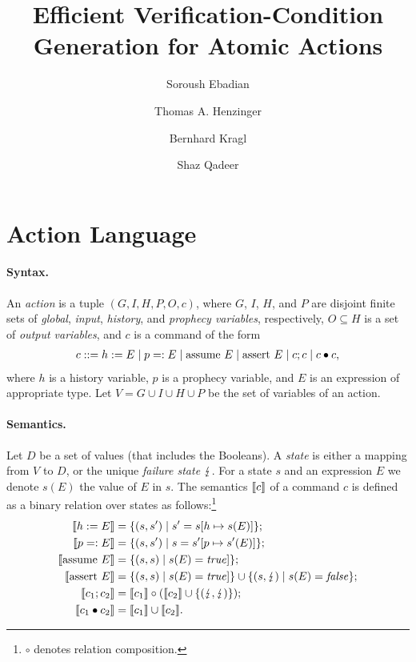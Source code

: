 \documentclass[runningheads,orivec]{llncs}
\begin{document}
\title{Efficient Verification-Condition Generation for Atomic Actions}

\author{%
Soroush Ebadian \and
Thomas A. Henzinger \and
Bernhard Kragl \and
Shaz Qadeer}



\maketitle

\section{Action Language}

\paragraph{Syntax.}
%
An \emph{action} is a tuple $(G,I,H,P,O,c)$, where $G$, $I$, $H$, and $P$ are disjoint finite sets of \emph{global}, \emph{input}, \emph{history}, and \emph{prophecy variables}, respectively, $O \subseteq H$ is a set of \emph{output variables}, and $c$ is a command of the form
%
\begin{align*}
  c ::= h := E \mid p =: E \mid \mathrm{assume}\ E \mid \mathrm{assert}\ E \mid c ; c \mid c \bullet c,
\end{align*}
%
where $h$ is a history variable, $p$ is a prophecy variable, and $E$ is an expression of appropriate type.
Let $V = G \cup I \cup H \cup P$ be the set of variables of an action.

\paragraph{Semantics.}
%
Let $D$ be a set of values (that includes the Booleans).
A \emph{state} is either a mapping from $V$ to $D$, or the unique \emph{failure state} $\lightning$.
For a state $s$ and an expression $E$ we denote $s(E)$ the value of $E$ in $s$.
The semantics $\llbracket c \rrbracket$ of a command $c$ is defined as a binary relation over states as follows:\footnote{$\circ$ denotes relation composition.}
%
\begin{align*}
  \llbracket h := E \rrbracket &= \{ (s,s') \mid s' = s[h \mapsto s(E)] \}; \\
  \llbracket p =: E \rrbracket &= \{ (s,s') \mid s = s'[p \mapsto s'(E)] \}; \\
  \llbracket \mathrm{assume}\ E \rrbracket &= \{ (s,s) \mid s(E) = \mathit{true}] \}; \\
  \llbracket \mathrm{assert}\ E \rrbracket &= \{ (s,s) \mid s(E) = \mathit{true}] \} \cup \{ (s,\lightning) \mid s(E) = \mathit{false} \}; \\
  \llbracket c_1 ; c_2 \rrbracket &= \llbracket c_1 \rrbracket \circ (\llbracket c_2 \rrbracket \cup \{ (\lightning,\lightning) \}); \\
  \llbracket c_1 \bullet c_2 \rrbracket &= \llbracket c_1 \rrbracket \cup \llbracket c_2 \rrbracket. \\
\end{align*}
\end{document}
